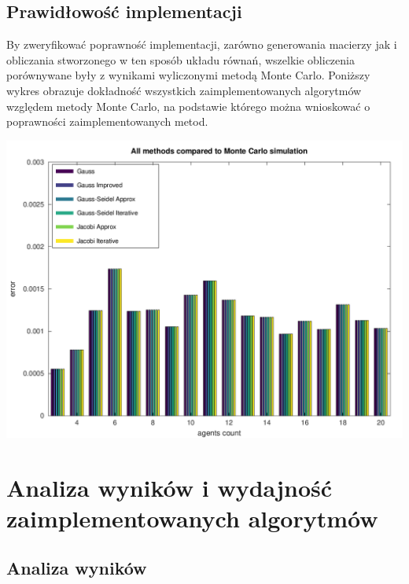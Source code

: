 \documentclass[10pt]{article}
\begin{document}
\subsection{Prawidłowość implementacji}
By zweryfikować poprawność implementacji, zarówno generowania macierzy jak i obliczania stworzonego w ten sposób układu równań,
wszelkie obliczenia porównywane były z wynikami wyliczonymi metodą Monte Carlo.
Poniższy wykres obrazuje dokładność wszystkich zaimplementowanych algorytmów względem metody Monte Carlo, na podstawie
którego można wnioskować o poprawności zaimplementowanych metod.

\includegraphics[scale=0.75]{plots/01_abs_all_methods_all_rows.png}

\section{Analiza wyników i wydajność zaimplementowanych algorytmów}

\subsection{Analiza wyników}
\end{document}

